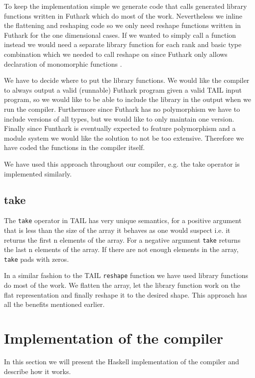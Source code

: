 \documentclass[11pt]{article}
\begin{document}
To keep the implementation simple we generate code that calls generated library functions written in Futhark which do most of the work.
Nevertheless we inline the flattening and reshaping code so we only need reshape functions written in Futhark
for the one dimensional cases. If we wanted to simply call a function instead we would need a separate library function for each
rank and basic type combination which we needed to call reshape on since Futhark only allows declaration of monomorphic functions \cite{TroelsHenriksen}.

We have to decide where to put the library functions.
We would like the compiler to always output a valid (runnable) Futhark program given a valid TAIL input program, so we would like to
be able to include the library in the output when we run the compiler.
Furthermore since Futhark has no polymorphism we have to include versions of all types, but we would like to only maintain one version.
Finally since Funthark is eventually expected to feature polymorphism and a module system we would like the solution to not be too
extensive\cite{TroelsHenriksen}. Therefore we have coded the functions in the compiler itself.

We have used this approach throughout our compiler, e.g. the take operator is implemented similarly.

\subsection{take} 

The {\tt take} operator in TAIL has very unique semantics, for a positive argument that is less than the size of the array it behaves as one would suspect i.e. it returns the first n elements of the array.
For a negative argument {\tt take} returns the last n elements of the array.
If there are not enough elements in the array, {\tt take} pads with zeros.

In a similar fashion to the TAIL {\tt reshape} function we have used library functions do most of the work.
We flatten the array, let the library function work on the flat representation and finally reshape it to the desired shape.
This approach has all the benefits mentioned earlier.

\section{Implementation of the compiler}

In this section we will present the Haskell implementation of the compiler and describe how it works.
\end{document}
